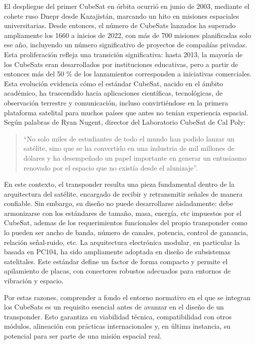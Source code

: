 \documentclass[12pt]{article}
\begin{document}
		
		El despliegue del primer CubeSat en órbita ocurrió en junio de 2003, mediante el cohete ruso Dnepr desde Kazajistán, marcando un hito en misiones espaciales universitarias. Desde entonces, el número de CubeSats lanzados ha superado ampliamente los 1660 a inicios de 2022, con más de 700 misiones planificadas solo ese año, incluyendo un número significativo de proyectos de compañías privadas. Esta proliferación refleja una transición significativa: hasta 2013, la mayoría de los CubeSats eran desarrollados por instituciones educativas, pero a partir de entonces más del 50 \% de los lanzamientos corresponden a iniciativas comerciales. Esta evolución evidencia cómo el estándar CubeSat, nacido en el ámbito académico, ha trascendido hacia aplicaciones científicas, tecnológicas, de observación terrestre y comunicación, incluso convirtiéndose en la primera plataforma satelital para muchos países que antes no tenían experiencia espacial. Según palabras de Ryan Nugent, director del Laboratorio CubeSat de Cal Poly:
		 
		\begin{quote}
			``No solo miles de estudiantes de todo el mundo han podido lanzar un satélite, 
			sino que se ha convertido en una industria de mil millones de dólares y ha 
			desempeñado un papel importante en generar un entusiasmo renovado por el 
			espacio que no existía desde el alunizaje''.
		\end{quote}\newpage
		
		En este contexto, el transponder resulta una pieza fundamental dentro de la arquitectura del satélite, encargado de recibir y retransmitir señales de manera confiable. Sin embargo, su diseño no puede desarrollarse aisladamente: debe armonizarse con los estándares de tamaño, masa, energía, etc impuestos por el CubeSat, ademas de los requerimientos funcionales del propio transponder como lo pueden ser ancho de banda, número de canales, potencia, control de ganancia, relación señal-ruido, etc. La arquitectura electrónica modular, en particular la basada en PC104, ha sido ampliamente adoptada en diseño de subsistemas satelitales. Este estándar define un factor de forma compacto y permite el apilamiento de placas, con conectores robustos adecuados para entornos de vibración y espacio.
		
		Por estas razones, comprender a fondo el entorno normativo en el que se integran los CubeSats es un requisito esencial antes de avanzar en el diseño de un transponder. Esto garantiza su viabilidad técnica, compatibilidad con otros módulos, alineación con prácticas internacionales y, en última instancia, su potencial para ser parte de una misión espacial real.
		
\end{document}
